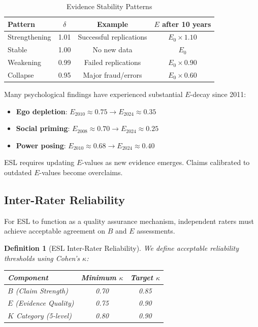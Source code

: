 \documentclass[11pt,a4paper]{article}
\newtheorem{definition}{Definition}[section]
\begin{document}
\begin{table}[h]
\centering
\caption{Evidence Stability Patterns}
\label{tab:decay}
\begin{tabular}{lccc}
\toprule
\textbf{Pattern} & \textbf{$\delta$} & \textbf{Example} & \textbf{$E$ after 10 years} \\
\midrule
Strengthening & 1.01 & Successful replications & $E_0 \times 1.10$ \\
Stable & 1.00 & No new data & $E_0$ \\
Weakening & 0.99 & Failed replications & $E_0 \times 0.90$ \\
Collapse & 0.95 & Major fraud/errors & $E_0 \times 0.60$ \\
\bottomrule
\end{tabular}
\end{table}

\begin{warningbox}[title={The Replication Crisis Effect}]
Many psychological findings have experienced substantial $E$-decay since 2011:
\begin{itemize}
    \item \textbf{Ego depletion}: $E_{2010} \approx 0.75 \rightarrow E_{2024} \approx 0.35$
    \item \textbf{Social priming}: $E_{2008} \approx 0.70 \rightarrow E_{2024} \approx 0.25$
    \item \textbf{Power posing}: $E_{2010} \approx 0.68 \rightarrow E_{2024} \approx 0.40$
\end{itemize}
ESL requires updating $E$-values as new evidence emerges. Claims calibrated to outdated $E$-values become overclaims.
\end{warningbox}

\subsection{Inter-Rater Reliability}

For ESL to function as a quality assurance mechanism, independent raters must achieve acceptable agreement on $B$ and $E$ assessments.

\begin{definition}[ESL Inter-Rater Reliability]
\label{def:irr}
We define acceptable reliability thresholds using Cohen's $\kappa$:
\begin{center}
\begin{tabular}{lcc}
\toprule
\textbf{Component} & \textbf{Minimum $\kappa$} & \textbf{Target $\kappa$} \\
\midrule
$B$ (Claim Strength) & 0.70 & 0.85 \\
$E$ (Evidence Quality) & 0.75 & 0.90 \\
$K$ Category (5-level) & 0.80 & 0.90 \\
\bottomrule
\end{tabular}
\end{center}
\end{definition}
\end{document}

